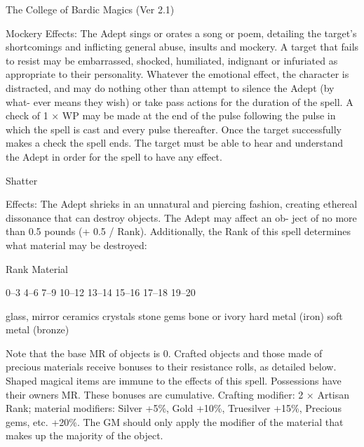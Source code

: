 \begin{Chapter}{The College of Bardic Magics (Ver 2.1)}
\begin{spell}[G-6]{Mockery }
Effects: The Adept sings or orates a song or poem, 
detailing  the  target’s  shortcomings  and  inflicting 
general  abuse,  insults  and  mockery.  A  target  that 
fails  to  resist  may  be  embarrassed,  shocked,  humiliated,  indignant  or  infuriated  as  appropriate  to 
their  personality.  Whatever  the  emotional  effect, 
the  character  is  distracted,  and  may  do  nothing 
other  than  attempt  to  silence  the  Adept  (by  what-
ever means they  wish) or take pass actions for the 
duration  of  the  spell.  A  check  of  1  ×  WP  may  be 
made at the end of the pulse following the pulse in 
which  the  spell  is  cast  and  every  pulse  thereafter. 
Once  the  target  successfully  makes  a  check  the 
spell  ends.  The  target  must  be  able  to  hear  and 
understand the Adept in order for the spell to have 
any effect. 
\end{spell}

\begin{spell}[G-7]{Shatter }

Effects:  The  Adept  shrieks  in  an  unnatural  and 
piercing  fashion,  creating  ethereal  dissonance  that 
can  destroy  objects.  The  Adept  may  affect  an  ob-
ject  of  no  more  than  0.5  pounds  (+  0.5  /  Rank). 
Additionally,  the  Rank  of  this  spell  determines 
what material may be destroyed: 

Rank  Material 

0–3 
4–6 
7–9 
10–12 
13–14 
15–16 
17–18 
19–20 

glass, mirror 
ceramics 
crystals 
stone 
gems 
bone or ivory 
hard metal (iron) 
soft metal (bronze) 

Note  that  the  base  MR  of  objects  is  0.  Crafted 
objects  and  those  made  of  precious  materials  receive  bonuses  to  their  resistance  rolls,  as  detailed 
below.  Shaped  magical  items  are  immune  to  the 
effects of this spell. Possessions have their owners 
MR. These bonuses are cumulative. Crafting modifier:  2  ×  Artisan  Rank;  material  modifiers:  Silver 
+5\%,  Gold  +10\%,  Truesilver  +15\%,  Precious 
gems,  etc.  +20\%.  The  GM  should  only  apply  the 
modifier of the material that makes up the majority 
of the object. 
\end{spell}


\end{Chapter}
